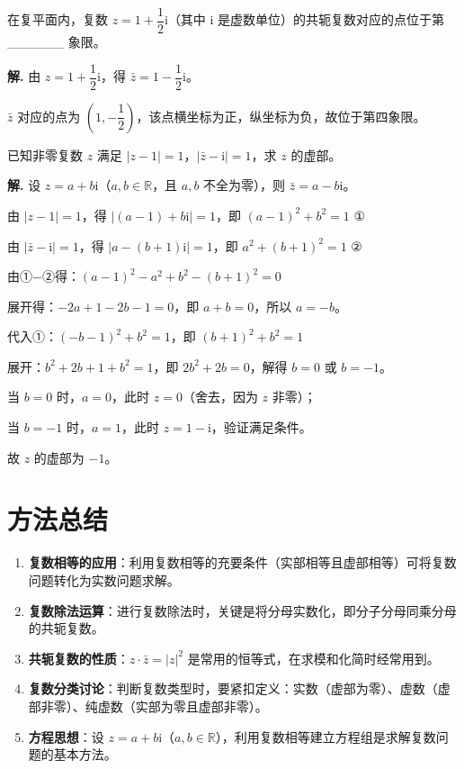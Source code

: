 \documentclass[11pt]{ctexrep}
\begin{document}
\begin{realexam}[2025 青浦一模]
    在复平面内，复数 $z = 1 + \dfrac{1}{2}\mathrm{i}$（其中 $\mathrm{i}$ 是虚数单位）的共轭复数对应的点位于第 \_\_\_\_\_\_ 象限。
\end{realexam}

\textbf{解.} 由 $z = 1 + \dfrac{1}{2}\mathrm{i}$，得 $\bar{z} = 1 - \dfrac{1}{2}\mathrm{i}$。

$\bar{z}$ 对应的点为 $\left(1, -\dfrac{1}{2}\right)$，该点横坐标为正，纵坐标为负，故位于第四象限。

\begin{example}[练习]
    已知非零复数 $z$ 满足 $|z - 1| = 1$，$|\bar{z} - \mathrm{i}| = 1$，求 $z$ 的虚部。
\end{example}

\textbf{解.} 设 $z = a + b\mathrm{i}$（$a, b \in \mathbb{R}$，且 $a, b$ 不全为零），则 $\bar{z} = a - b\mathrm{i}$。

由 $|z - 1| = 1$，得 $|(a - 1) + b\mathrm{i}| = 1$，即 $(a - 1)^2 + b^2 = 1$ \quad ①

由 $|\bar{z} - \mathrm{i}| = 1$，得 $|a - (b + 1)\mathrm{i}| = 1$，即 $a^2 + (b + 1)^2 = 1$ \quad ②

由①$-$②得：$(a - 1)^2 - a^2 + b^2 - (b + 1)^2 = 0$

展开得：$-2a + 1 - 2b - 1 = 0$，即 $a + b = 0$，所以 $a = -b$。

代入①：$(-b - 1)^2 + b^2 = 1$，即 $(b + 1)^2 + b^2 = 1$

展开：$b^2 + 2b + 1 + b^2 = 1$，即 $2b^2 + 2b = 0$，解得 $b = 0$ 或 $b = -1$。

当 $b = 0$ 时，$a = 0$，此时 $z = 0$（舍去，因为 $z$ 非零）；

当 $b = -1$ 时，$a = 1$，此时 $z = 1 - \mathrm{i}$，验证满足条件。

故 $z$ 的虚部为 $-1$。

\section*{方法总结}

\begin{enumerate}
    \item \textbf{复数相等的应用}：利用复数相等的充要条件（实部相等且虚部相等）可将复数问题转化为实数问题求解。
    
    \item \textbf{复数除法运算}：进行复数除法时，关键是将分母实数化，即分子分母同乘分母的共轭复数。
    
    \item \textbf{共轭复数的性质}：$z \cdot \bar{z} = |z|^2$ 是常用的恒等式，在求模和化简时经常用到。
    
    \item \textbf{复数分类讨论}：判断复数类型时，要紧扣定义：实数（虚部为零）、虚数（虚部非零）、纯虚数（实部为零且虚部非零）。
    
    \item \textbf{方程思想}：设 $z = a + b\mathrm{i}$（$a, b \in \mathbb{R}$），利用复数相等建立方程组是求解复数问题的基本方法。
\end{enumerate}
\end{document}
